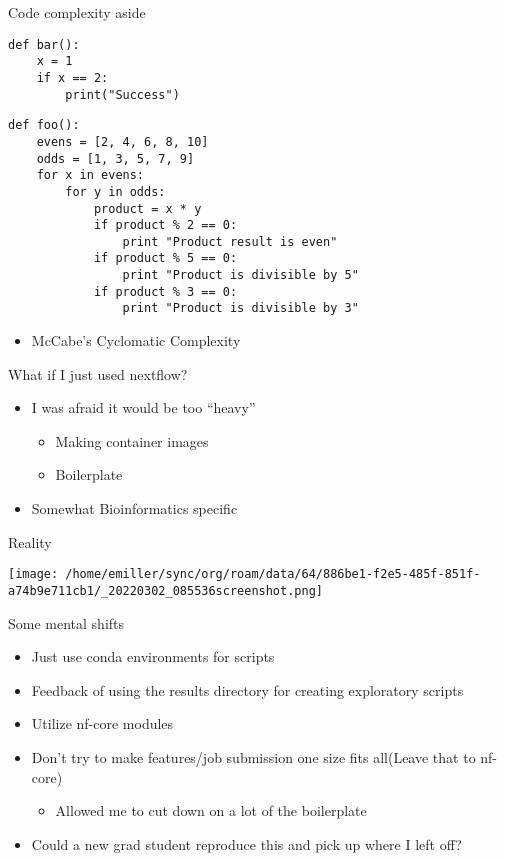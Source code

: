 \documentclass[bigger]{beamer}
\begin{document}
\begin{frame}[label={sec:org4008932},fragile,shrink=10]{Code complexity aside}
 \begin{verbatim}
def bar():
    x = 1
    if x == 2:
        print("Success")
\end{verbatim}

\begin{verbatim}
def foo():
    evens = [2, 4, 6, 8, 10]
    odds = [1, 3, 5, 7, 9]
    for x in evens:
        for y in odds:
            product = x * y
            if product % 2 == 0:
                print "Product result is even"
            if product % 5 == 0:
                print "Product is divisible by 5"
            if product % 3 == 0:
                print "Product is divisible by 3"
\end{verbatim}

\begin{itemize}
\item McCabe's Cyclomatic Complexity
\end{itemize}
\end{frame}

\begin{frame}[label={sec:org8e921c0}]{What if I just used nextflow?}
\begin{itemize}
\item I was afraid it would be too ``heavy''
\begin{itemize}
\item Making container images
\item Boilerplate
\end{itemize}
\item Somewhat Bioinformatics specific
\end{itemize}
\end{frame}

\begin{frame}[label={sec:org520af08}]{Reality}
\begin{center}
\texttt{[image: /home/emiller/sync/org/roam/data/64/886be1-f2e5-485f-851f-a74b9e711cb1/\_20220302\_085536screenshot.png]}
\end{center}
\end{frame}

\begin{frame}[label={sec:org487bbc3}]{Some mental shifts}
\begin{itemize}
\item Just use conda environments for scripts
\item Feedback of using the results directory for creating exploratory scripts
\item Utilize nf-core modules
\item Don't try to make features/job submission one size fits all(Leave that to
nf-core)
\begin{itemize}
\item Allowed me to cut down on a lot of the boilerplate
\end{itemize}
\item Could a new grad student reproduce this and pick up where I left off?
\end{itemize}
\end{frame}
\end{document}
